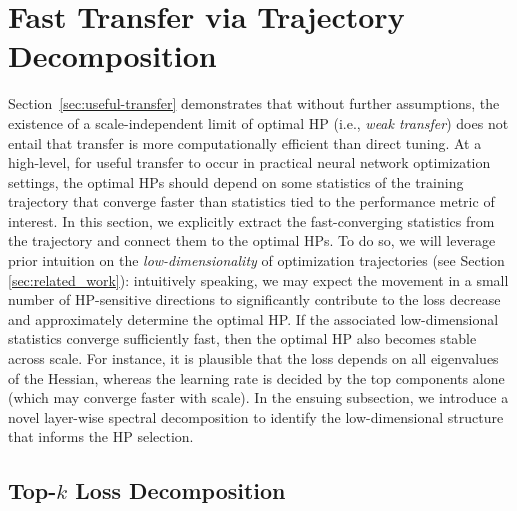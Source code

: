 \section{Fast Transfer via Trajectory Decomposition}\label{sec:fast-transfer}

Section~\ref{sec:useful-transfer} demonstrates that without further assumptions, the existence of a scale-independent limit of optimal HP (i.e., \textit{weak transfer}) does not entail that transfer is more computationally efficient than direct tuning. At a high-level, for useful transfer to occur in practical neural network optimization settings, the optimal HPs should depend on some statistics of the training trajectory that converge faster than statistics tied to the performance metric of interest. 
In this section, we explicitly extract the fast-converging statistics from the trajectory and connect them to the optimal HPs. 
To do so, we will leverage prior intuition on the \textit{low-dimensionality} of optimization trajectories (see Section \ref{sec:related_work}): intuitively speaking, we may expect the movement in a small number of HP-sensitive directions to significantly contribute to the loss decrease and approximately determine the optimal HP. If the associated low-dimensional statistics converge sufficiently fast, then the optimal HP also becomes stable across scale. For instance, it is plausible that the loss depends on all eigenvalues of the Hessian, whereas the learning rate is decided by the top components alone (which may converge faster with scale). In the ensuing subsection, we introduce a novel layer-wise spectral decomposition to identify the low-dimensional structure that informs the HP selection.


\subsection{\texorpdfstring{Top-$k$ Loss Decomposition}{Top-k Loss Decomposition}}\label{sec:topk_decomposition}


